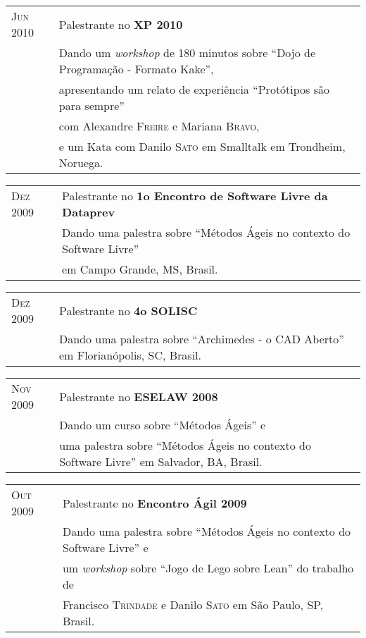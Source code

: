 \documentclass[letter,10pt]{article}
\begin{document}
\begin{tabular}{p{2.5cm}l}
  \textsc{Jun 2010} & Palestrante no \textbf{XP 2010}\\
  &Dando um \textit{workshop} de 180 minutos sobre ``Dojo de
  Programação - Formato Kake'',\\
  & apresentando um relato de experiência ``Protótipos são para sempre''\\
  & com Alexandre \textsc{Freire} e Mariana \textsc{Bravo},\\
  & e um Kata com Danilo \textsc{Sato} em Smalltalk em Trondheim, Noruega.\\
\end{tabular}

\begin{tabular}{p{2.5cm}l}
  \textsc{Dez 2009} & Palestrante no \textbf{1o Encontro de Software
    Livre da Dataprev}\\
  &Dando uma palestra sobre ``Métodos Ágeis no contexto do Software Livre''\\
  &em Campo Grande, MS, Brasil.\\
\end{tabular}

\begin{tabular}{p{2.5cm}l}
  \textsc{Dez 2009} & Palestrante no \textbf{4o SOLISC}\\
  &Dando uma palestra sobre ``Archimedes - o CAD Aberto'' em Florianópolis, SC, Brasil.\\
\end{tabular}

\begin{tabular}{p{2.5cm}l}
  \textsc{Nov 2009} & Palestrante no \textbf{ESELAW 2008}\\
  &Dando um curso sobre ``Métodos Ágeis'' e\\
  &uma palestra sobre ``Métodos Ágeis no contexto do Software Livre'' em Salvador, BA, Brasil.\\
\end{tabular}

\begin{tabular}{p{2.5cm}l}
  \textsc{Out 2009} & Palestrante no \textbf{Encontro Ágil 2009}\\
  &Dando uma palestra sobre ``Métodos Ágeis no contexto do Software Livre'' e\\
  &um \textit{workshop} sobre ``Jogo de Lego sobre Lean'' do trabalho de\\
  &Francisco \textsc{Trindade} e Danilo \textsc{Sato} em São Paulo, SP, Brasil.\\
\end{tabular}
\end{document}
